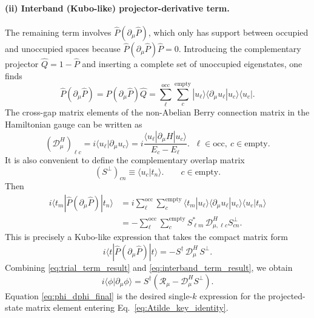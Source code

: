 \documentclass[galley,aps,pra,10pt,amsmath,amssymb,
    superscriptaddress,nofootinbib,longbibliography]{revtex4-2}
\begin{document}
\paragraph*{(ii) Interband (Kubo-like) projector-derivative term.}
The remaining term involves $\hat P(\partial_\mu\hat P)$, which only has support between occupied and unoccupied spaces because
$\hat P(\partial_\mu\hat P)\hat P=0$.
Introducing the complementary projector $\hat Q=1-\hat P$ and inserting a complete set of unoccupied eigenstates, one finds
\begin{equation}
\label{eq:PdP_expand}
\hat P(\partial_\mu \hat P)
=
\hat P(\partial_\mu\hat P)\hat Q
=
\sum_{\ell}^{\mathrm{occ}}\sum_{c}^{\mathrm{empty}}
|u_\ell\rangle\langle \partial_\mu u_\ell| u_c\rangle\langle u_c|.
\end{equation}
The cross-gap matrix elements of the non-Abelian Berry connection matrix in the Hamiltonian gauge can be written as
\begin{equation}
\label{eq:Vmu_def_here}
(\mathcal{D}^{H}_\mu)_{\ell c}
= i\langle u_\ell | \partial_\mu u_c \rangle = i
\frac{\langle u_{\ell }|\partial_{\mu}H|u_{c}\rangle}{E_{c}-E_{\ell}}.
\;\; \ell \in\mathrm{occ},\ c\in\mathrm{empty}.
\end{equation}
It is also convenient to define the complementary overlap matrix
\begin{equation}
\label{eq:Sperp}
(S^\perp)_{c n}\equiv \langle u_{c}|t_{n}\rangle.
\qquad c\in\mathrm{empty}.
\end{equation}
Then
\begin{align}
i\langle t_m|\hat P(\partial_\mu\hat P)|t_n\rangle
&=
i\sum_{\ell}^{\mathrm{occ}}\sum_{c}^{\mathrm{empty}}
\langle t_m|u_\ell \rangle
\langle \partial_\mu u_\ell | u_c\rangle
\langle u_c|t_n\rangle
\nonumber\\
&= -
\sum_{\ell}^{\mathrm{occ}}\sum_{c}^{\mathrm{empty}}
S^*_{\ell m}\,
\mathcal{D}^H_{\mu,\ell c}
S^\perp_{c n}.
\label{eq:interband_term_mid}
\end{align}
This is precisely a Kubo-like expression that takes the compact matrix form
\begin{equation}
\label{eq:interband_term_result}
i\langle t|\hat P(\partial_\mu\hat P)|t\rangle
=
- S^\dagger\,\mathcal{D}^H_\mu\,S^\perp .
\end{equation}
Combining \eqref{eq:trial_term_result} and \eqref{eq:interband_term_result}, we obtain
\begin{equation}
\label{eq:phi_dphi_final}
i\langle\phi|\partial_\mu\phi\rangle
=
S^\dagger\!\left(\mathcal{R}_\mu - \mathcal{D}^H_\mu S^\perp\right).
\end{equation}
Equation \eqref{eq:phi_dphi_final} is the desired single-$k$ expression for the projected-state matrix element entering Eq.~\eqref{eq:Atilde_key_identity}.
\end{document}
